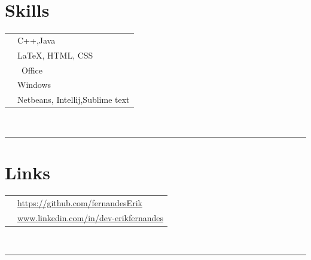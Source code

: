 \documentclass[oneside]{article}
\begin{document}
{\begin{minipage}[t][\textheight-2\fboxsep-2\fboxrule][t]{\dimexpr0.40\textwidth-2\fboxrule-2\fboxsep\relax}
        \section*{\large Skills}
        \begin{tabularx}{\textwidth}{cY}
            \faCode{}        & C++,Java\\
            \faPen*{}        & \LaTeX, HTML, CSS \\
            \faFont{}        & \ Office \\
            \faCogs{}        &  Windows \\
            \faLaptopCode{}  & Netbeans, Intellij,Sublime text \\
            
        \end{tabularx}
        \vspace{1pt} \\
        \rule{\linewidth}{0.4pt}
        \section*{\large Links}
        \begin{tabular}{cl}
            \faGithub{}   & \href{https://github.com/example}{https://github.com/fernandesErik} \\
            \faLinkedin{} & \href{https://www.linkedin.com/in/john-doe/}{www.linkedin.com/in/dev-erikfernandes} \\
            
        \end{tabular}
        \vspace{10pt} \\
        \rule{\linewidth}{0.4pt} \\
      
        \vfill
        
    \end{minipage}
}
\end{document}
